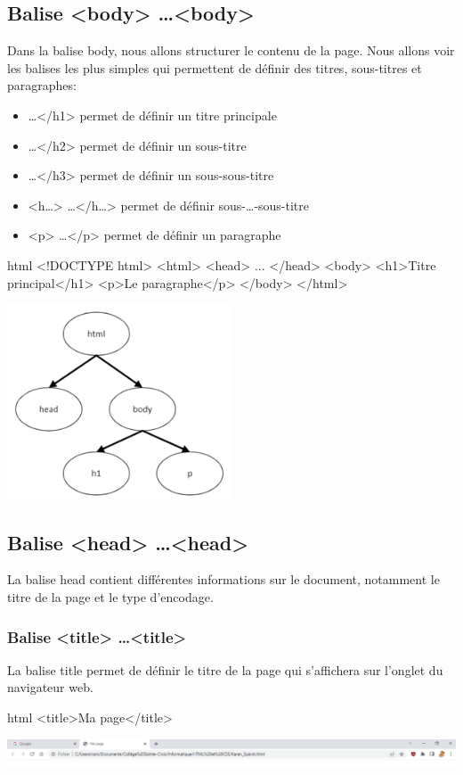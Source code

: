 \documentclass[a4paper,11pt]{article}
\begin{document}
\subsection{Balise <body> \dots <body>}
Dans la balise body, nous allons structurer le contenu de la page. Nous allons voir les balises les plus simples qui permettent de définir des titres, sous-titres et paragraphes:
\begin{itemize}
\item <h1> \dots </h1>  permet de définir un titre principale
\item <h2> \dots </h2>  permet de définir un sous-titre
\item <h3> \dots </h3>  permet de définir un sous-sous-titre
\item <h\dots> \dots </h\dots>  permet de définir  sous-\dots-sous-titre
\item  <p> \dots </p>  permet de définir un paragraphe
\end{itemize}
\begin{multicols}{2}
\begin{code}{html}
<!DOCTYPE html>
<html>
  <head> ... </head>
  <body>
    <h1>Titre principal</h1>
    <p>Le paragraphe</p>
  </body>
</html>
\end{code}
\includegraphics[width=0.5\textwidth]{images/balise-body.png} \\
\end{multicols}

\subsection{Balise <head> \dots <head>}
La balise head contient différentes informations sur le document, notamment le titre de la page et le type d'encodage.

\subsubsection{Balise <title> \dots <title>}
La balise title permet de définir le titre de la page qui s'affichera sur l'onglet du navigateur web.
\begin{code}{html}
<title>Ma page</title>
\end{code}
\includegraphics[width=1.0\textwidth]{images/barre-titre.png}
\end{document}
